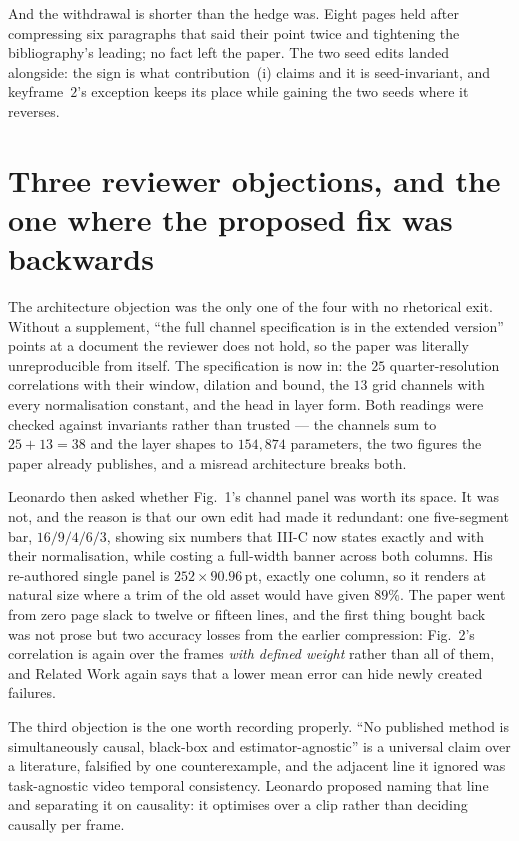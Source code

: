 \documentclass[11pt,a4paper]{article}
\begin{document}
And the withdrawal is shorter than the hedge was. Eight pages held after
compressing six paragraphs that said their point twice and tightening the
bibliography's leading; no fact left the paper. The two seed edits landed
alongside: the sign is what contribution~(i) claims and it is seed-invariant,
and keyframe~$2$'s exception keeps its place while gaining the two seeds where
it reverses.



\section*{Three reviewer objections, and the one where the proposed fix was backwards}

The architecture objection was the only one of the four with no rhetorical exit.
Without a supplement, ``the full channel specification is in the extended
version'' points at a document the reviewer does not hold, so the paper was
literally unreproducible from itself. The specification is now in: the $25$
quarter-resolution correlations with their window, dilation and bound, the $13$
grid channels with every normalisation constant, and the head in layer form.
Both readings were checked against invariants rather than trusted --- the
channels sum to $25{+}13=38$ and the layer shapes to $154{,}874$ parameters,
the two figures the paper already publishes, and a misread architecture breaks
both.

Leonardo then asked whether Fig.~1's channel panel was worth its space. It was
not, and the reason is that our own edit had made it redundant: one
five-segment bar, $16/9/4/6/3$, showing six numbers that III-C now states
exactly and with their normalisation, while costing a full-width banner across
both columns. His re-authored single panel is $252\times90.96$\,pt, exactly
one column, so it renders at natural size where a trim of the old asset would
have given $89\%$. The paper went from zero page slack to twelve or fifteen
lines, and the first thing bought back was not prose but two accuracy losses
from the earlier compression: Fig.~2's correlation is again over the frames
\emph{with defined weight} rather than all of them, and Related Work again says
that a lower mean error can hide newly created failures.

The third objection is the one worth recording properly. ``No published method
is simultaneously causal, black-box and estimator-agnostic'' is a universal
claim over a literature, falsified by one counterexample, and the adjacent line
it ignored was task-agnostic video temporal consistency. Leonardo proposed
naming that line and separating it on causality: it optimises over a clip
rather than deciding causally per frame.
\end{document}
